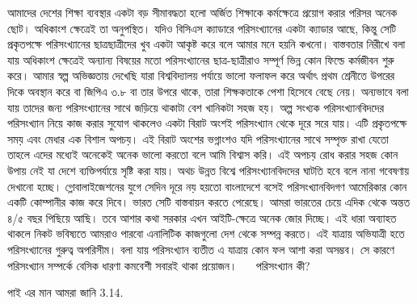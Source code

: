 \documentclass[11pt, twoside, openright, a4paper,xetex]{book}\usepackage[]{graphicx}\usepackage[]{color}
\begin{document}
আমাদের দেশের শিক্ষা ব্যবস্থার একটা বড় সীমাবদ্ধতা হলো অর্জিত শিক্ষাকে কর্মক্ষেত্রে প্রয়োগ করার পরিসর অনেক ছোট। অধিকাংশ ক্ষেত্রেই তা অনুপস্থিত। যদিও বিসিএস ক্যাডারে পরিসংখ্যানের একটা ক্যাডার আছে, কিন্তু সেটি প্রকৃতপক্ষে পরিসংখ্যানের ছাত্রছাত্রীদের খুব একটা আকৃষ্ট করে বলে আমার মনে হয়নি কখনো। বাস্তবতার নিরীখে বলা যায় অধিকাংশ ক্ষেত্রেই অন্যান্য বিষয়ের মতো পরিসংখ্যানের ছাত্র-ছাত্রীরাও সম্পূর্ণ ভিন্ন কোন ফিল্ডে কর্মজীবন শুরু করে।
আমার স্বল্প অভিজ্ঞতায় দেখেছি যারা বিশ্ববিদ্যালয় পর্যায়ে ভালো ফলাফল করে অর্থাৎ প্রথম শ্রেনীতে উপরের দিকে অবস্থান করে বা জিপিএ ৩.৮ বা তার উপরে থাকে, তারা শিক্ষকতাকে পেশা হিসেবে বেছে নেয়। অন্যভাবে বলা যায় তাদের জন্য পরিসংখ্যানের সাথে জড়িয়ে থাকাটা বেশ খানিকটা সহজ হয়।
অল্প সংখ্যক পরিসংখ্যানবিদদের পরিসংখ্যান নিয়ে কাজ করার সুযোগ থাকলেও একটা বিরাট অংশই পরিসংখ্যান থেকে দূরে সরে যায়। এটি প্রকৃতপক্ষে সময় এবং মেধার এক বিশাল অপচয়। এই বিরাট অংশের ভগ্নাংশও যদি পরিসংখ্যানের সাথে সম্পৃক্ত রাখা যেতো তাহলে এদের মধ্যেই অনেকেই অনেক ভালো করতো বলে আমি বিশ্বাস করি।
এই অপচয় রোধ করার সহজ কোন উপায় নেই যা দেশে ব্যক্তিপর্যায়ে সৃষ্টি করা যায়। অথচ উন্নত বিশ্বে পরিসংখ্যানবিদদের ঘাটতি হবে বলে নানা গবেষণায় দেখানো হচ্ছে।
গ্লোবালাইজেশনের যুগে সেদিন দূরে নয় হয়তো বাংলাদেশে বসেই পরিসংখ্যানবিদগণ আমেরিকার কোন একটি কোম্পানীর কাজ করে দিবে। ভারত সেটি বাস্তবায়ন করতে পেরেছে। আমরা ভারতের চেয়ে এদিক থেকে অন্তত ৪/৫ বছর পিছিয়ে আছি। তবে আশার কথা সরকার এখন আইটি-ক্ষেত্রে অনেক জোর দিচ্ছে। এই ধারা অব্যাহত থাকলে নিকট ভবিষ্যতে আমরাও পারবো এনালিটিক কাজগুলো দেশ থেকে সম্পন্ন করতে।
এই যাত্রায় অভিযাত্রী হতে পরিসংখ্যানের গুরুত্ব অপরিসীম। বলা যায় পরিসংখ্যান ব্যতীত এ যাত্রায় কোন ফল আশা করা অসম্ভব।  সে কারণে পরিসংখ্যান সম্পর্কে বেসিক ধারণা কমবেশী সবারই থাকা প্রয়োজন।
 
পরিসংখ্যান কী?

পাই এর মান আমরা জানি 3.14.
\end{document}
